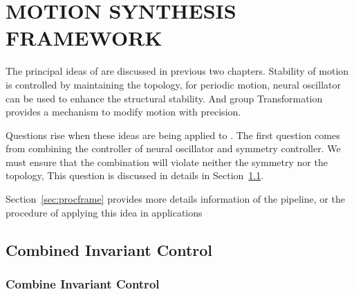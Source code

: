 \chapter {MOTION SYNTHESIS FRAMEWORK}
\label{chap:msf}
\graphicspath{{CombineFramework/CombineFrameworkFigs/EPS/}{CombineFramework/CombineFrameworkFigs/}}
The principal ideas of \moit are discussed in previous two chapters.
Stability of motion is controlled by maintaining the topology, 
for periodic motion, neural oscillator can be used to enhance the structural stability.
And group Transformation provides a mechanism to modify motion with precision.


Questions rise when these ideas are being applied  to \cms.
The first question comes from combining the controller of neural oscillator and symmetry controller.
We must ensure that the combination will violate neither the symmetry nor the topology,
This question is discussed in details in Section~\ref{sec:combin}.


Section~\ref{sec:procframe} provides more details information of the pipeline, or the procedure of applying this idea in \cms applications

%
%
%
%

\section{Combined Invariant Control}
\label{sec:combin}
\subsection{ Combine Invariant Control}

